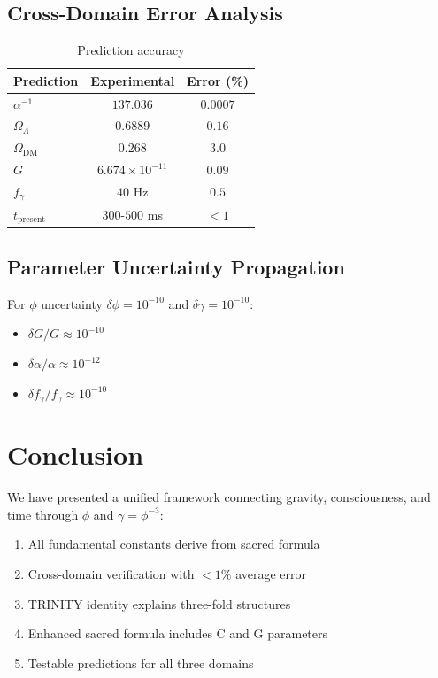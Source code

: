 \documentclass[12pt,a4paper]{article}
\begin{document}
\subsection{Cross-Domain Error Analysis}

\begin{table}[h]
\centering
\begin{tabular}{lcc}
\toprule
Prediction & Experimental & Error (\%) \\
\midrule
$\alpha^{-1}$ & $137.036$ & $0.0007$ \\
$\Omega_\Lambda$ & $0.6889$ & $0.16$ \\
$\Omega_{\text{DM}}$ & $0.268$ & $3.0$ \\
$G$ & $6.674 \times 10^{-11}$ & $0.09$ \\
$f_\gamma$ & $40$ Hz & $0.5$ \\
$t_{\text{present}}$ & $300\text{-}500$ ms & $< 1$ \\
\bottomrule
\end{tabular}
\caption{Prediction accuracy}
\end{table}

\subsection{Parameter Uncertainty Propagation}

For $\phi$ uncertainty $\delta\phi = 10^{-10}$ and $\delta\gamma = 10^{-10}$:
\begin{itemize}
\item $\delta G/G \approx 10^{-10}$
\item $\delta\alpha/\alpha \approx 10^{-12}$
\item $\delta f_\gamma/f_\gamma \approx 10^{-10}$
\end{itemize}

\section{Conclusion}

We have presented a unified framework connecting gravity, consciousness, and time through $\phi$ and $\gamma = \phi^{-3}$:

\begin{enumerate}
\item All fundamental constants derive from sacred formula
\item Cross-domain verification with $< 1\%$ average error
\item TRINITY identity explains three-fold structures
\item Enhanced sacred formula includes C and G parameters
\item Testable predictions for all three domains
\end{enumerate}
\end{document}
